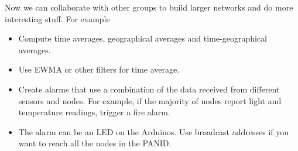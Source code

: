 Now we can collaborate with other groups to build larger networks and do more interesting stuff.
For example
\begin{itemize}
\item Compute time averages, geographical averages and time-geographical averages.
\item Use EWMA or other filters for time average.
\item Create alarms that use a combination of the data received from different sensors and nodes. 
For example, if the majority of nodes report light and temperature readings, trigger a fire alarm.
\item The alarm can be an LED on the Arduinos.
Use broadcast addresses if you want to reach all the nodes in the PANID.
\end{itemize}
